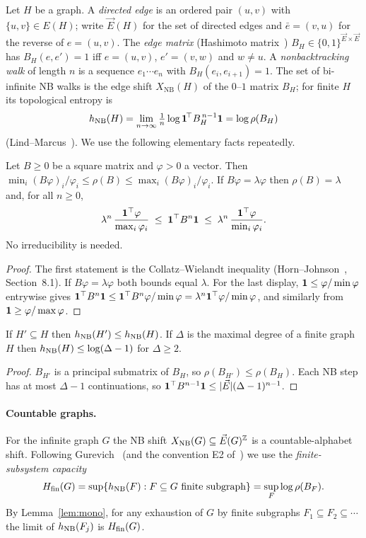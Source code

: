 Let $H$ be a graph. A \emph{directed edge} is an ordered pair $(u,v)$ with $\{u,v\}\in E(H)$; write $\vec E(H)$ for the set of directed edges and $\bar e=(v,u)$ for the reverse of $e=(u,v)$. The \emph{edge matrix} (Hashimoto matrix~\cite{Ha,Ba}) $B_H\in\{0,1\}^{\vec E\times\vec E}$ has $B_H(e,e')=1$ iff $e=(u,v)$, $e'=(v,w)$ and $w\ne u$. A \emph{nonbacktracking walk} of length $n$ is a sequence $e_1\cdots e_n$ with $B_H(e_i,e_{i+1})=1$. The set of bi-infinite NB walks is the edge shift $X_{\mathrm{NB}}(H)$ of the $0$--$1$ matrix $B_H$; for finite $H$ its topological entropy is
\[
h_{\mathrm{NB}}(H)=\lim_{n\to\infty}\tfrac1n\log\mathbf{1}^{\!\top}B_H^{\,n-1}\mathbf{1}=\log\rho(B_H)
\]
(Lind--Marcus~\cite{LM}). We use the following elementary facts repeatedly.

\begin{lemma}\label{lem:CW}
Let $B\ge0$ be a square matrix and $\varphi>0$ a vector. Then $\min_i(B\varphi)_i/\varphi_i\le\rho(B)\le\max_i(B\varphi)_i/\varphi_i$. If $B\varphi=\lambda\varphi$ then $\rho(B)=\lambda$ and, for all $n\ge0$,
\[
\lambda^{n}\,\frac{\mathbf{1}^\top\varphi}{\max_i\varphi_i}\;\le\;\mathbf{1}^\top B^n\mathbf{1}\;\le\;\lambda^n\,\frac{\mathbf{1}^\top\varphi}{\min_i\varphi_i}.
\]
No irreducibility is needed.
\end{lemma}
\begin{proof}
The first statement is the Collatz--Wielandt inequality (Horn--Johnson~\cite{HJ}, Section~8.1). If $B\varphi=\lambda\varphi$ both bounds equal $\lambda$. For the last display, $\mathbf{1}\le\varphi/\min\varphi$ entrywise gives $\mathbf{1}^\top B^n\mathbf{1}\le\mathbf{1}^\top B^n\varphi/\min\varphi=\lambda^n\mathbf{1}^\top\varphi/\min\varphi$, and similarly from $\mathbf{1}\ge\varphi/\max\varphi$. \qedhere
\end{proof}

\begin{lemma}\label{lem:mono}
If $H'\subseteq H$ then $h_{\mathrm{NB}}(H')\le h_{\mathrm{NB}}(H)$. If $\Delta$ is the maximal degree of a finite graph $H$ then $h_{\mathrm{NB}}(H)\le\log(\Delta-1)$ for $\Delta\ge2$.
\end{lemma}
\begin{proof}
$B_{H'}$ is a principal submatrix of $B_H$, so $\rho(B_{H'})\le\rho(B_H)$. Each NB step has at most $\Delta-1$ continuations, so $\mathbf{1}^\top B^{n-1}\mathbf{1}\le|\vec E|(\Delta-1)^{n-1}$. \qedhere
\end{proof}

\paragraph{Countable graphs.}
For the infinite graph $G$ the NB shift $X_{\mathrm{NB}}(G)\subseteq\vec E(G)^{\mathbb{Z}}$ is a countable-alphabet shift. Following Gurevich~\cite{Gu} (and the convention E2 of~\cite{UENT}) we use the \emph{finite-subsystem capacity}
\[
H_{\mathrm{fin}}(G)=\sup\{h_{\mathrm{NB}}(F):F\subseteq G\text{ finite subgraph}\}=\sup_{F}\log\rho(B_F).
\]
By Lemma~\ref{lem:mono}, for any exhaustion of $G$ by finite subgraphs $F_1\subseteq F_2\subseteq\cdots$ the limit of $h_{\mathrm{NB}}(F_j)$ is $H_{\mathrm{fin}}(G)$.

